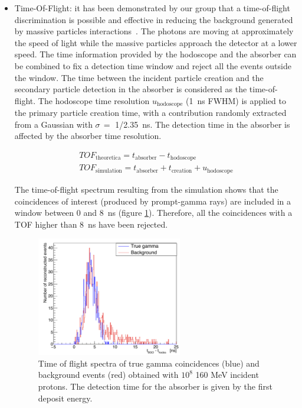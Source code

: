 \begin{itemize}
\item Time-Of-Flight: it has been demonstrated by our group that a time-of-flight discrimination is possible and effective in reducing the background generated by massive particles interactions~\cite{Testa:2010aa}. The photons are moving at approximately the speed of light while the massive particles approach the detector at a lower speed. The time information provided by the hodoscope and the absorber can be combined to fix a detection time window and reject all the events outside the window. The time between the incident particle creation and the secondary particle detection in the absorber is considered as the time-of-flight. The hodoscope time resolution $u_{\mathrm{hodoscope}}$ (1~ns FWHM) is applied to the primary particle creation time, with a contribution randomly extracted from a Gaussian with $\sigma\,=$ 1/2.35~ns. The detection time in the absorber is affected by the absorber time resolution.

 \begin{eqnarray}
TOF_{\mathrm{theoretica}} = t_{\mathrm{absorber}}-t_{\mathrm{hodoscope}} \\
TOF_{\mathrm{simulation}} = t_{\mathrm{absorber}}+t_{\mathrm{creation}} + u_{\mathrm{hodoscope}}
\label{TOF_equation}
\end{eqnarray} 

The time-of-flight spectrum resulting from the simulation shows that the coincidences of interest (produced by prompt-gamma rays) are included in a window between 0 and 8~ns (figure \ref{fig:fig_TOF_distribution_CC_simulation_Hadronth}). Therefore, all the coincidences with a TOF higher than 8~ns have been rejected.
\begin{figure}	
  \centering
  \includegraphics[width=0.6\textwidth]{./Figure/TOFspectra_2}
  \caption{Time of flight spectra of true gamma coincidences (blue) and background events (red) obtained with $10^{8}$ 160 MeV incident protons. The detection time for the absorber is given by the first deposit energy.}	
  \label{fig:fig_TOF_distribution_CC_simulation_Hadronth}
\end{figure}


\end{itemize}
